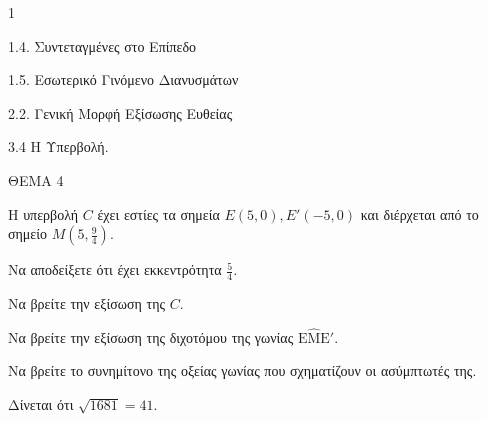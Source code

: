 \begin{ylh}{1}
    \item 1.4. Συντεταγμένες στο Επίπεδο
    \item 1.5. Εσωτερικό Γινόμενο Διανυσμάτων
    \item 2.2. Γενική Μορφή Εξίσωσης Ευθείας
    \item 3.4 Η Υπερβολή.
\end{ylh}
ΘΕΜΑ 4

Η υπερβολή $C$ έχει εστίες τα σημεία $E(5,0), E'(-5,0)$ και διέρχεται από το σημείο $M\left(5, \frac{9}{4}\right)$.

\begin{alist}
    \item Να αποδείξετε ότι έχει εκκεντρότητα $\frac{5}{4}$. 
    \item Να βρείτε την εξίσωση της $C$. 
    \item Να βρείτε την εξίσωση της διχοτόμου της γωνίας $\text{E}\hat{\text{M}}\text{E}'$. 
    \item Να βρείτε το συνημίτονο της οξείας γωνίας που σχηματίζουν οι ασύμπτωτές της. 
\end{alist}
Δίνεται ότι $\sqrt{1681}=41$.
